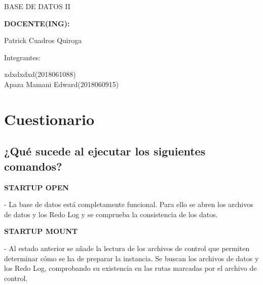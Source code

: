 \documentclass[12pt,letterpaper]{article}
\begin{document}
\begin{titlepage}
\begin{center}
\vspace*{0.1in}
\begin{large}
BASE DE DATOS II\\
\end{large}

\vspace*{0.3in}
\begin{Large}
\textbf{DOCENTE(ING):} \\
\end{Large}

\vspace*{0.1in}
\begin{large}
 Patrick Cuadros Quiroga\\
\end{large}

\vspace*{0.2in}
\vspace*{0.1in}
\begin{large}
Integrantes: \\
\begin{flushleft}
xdxdxdxd\hfill	(2018061088) \\
Apaza Mamani Edward\hfill	(2018060915) \\
\end{flushleft}
\end{large}
\end{center}

\end{titlepage}

\tableofcontents %
\thispagestyle{empty} %
\newpage
\setcounter{page}{1} %




\section{Cuestionario}
\subsection{¿Qué sucede al ejecutar los siguientes comandos?} 

\textbf{STARTUP OPEN} \ 
\begin{itemize}
- La base de datos está completamente funcional. Para ello se abren los archivos de datos y los Redo Log y se comprueba la consistencia de los datos.\\
\end{itemize} 


\textbf{STARTUP MOUNT} \ 
\begin{itemize}
- Al estado anterior se añade la lectura de los archivos de control que permiten determinar cómo se ha de preparar la instancia. Se buscan los archivos de datos y los Redo Log, comprobando su existencia en las rutas marcadas por el archivo de control.\\
\end{itemize} 
\end{document}
